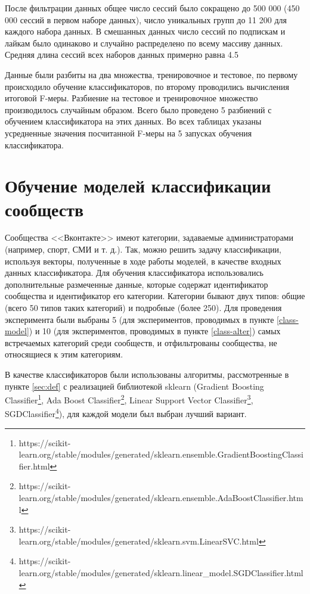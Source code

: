 \documentclass[times,specification,annotation]{itmo-student-thesis}
\begin{document}
После фильтрации данных общее число сессий было сокращено до 500 000 (450 000 сессий в первом наборе данных), число уникальных групп до 11 200 для каждого набора данных. В смешанных данных число сессий по подпискам и лайкам было одинаково и случайно распределено по всему массиву данных. Средняя длина сессий всех наборов данных примерно равна 4.5

Данные были разбиты на два множества, тренировочное и тестовое, по первому происходило обучение классификаторов, по второму проводились вычисления итоговой F-меры. Разбиение на тестовое и тренировочное множество производилось случайным образом. Всего было проведено 5 разбиений с обучением классификатора на этих данных. Во всех таблицах указаны усредненные значения посчитанной F-меры на 5 запусках обучения классификатора.

\section{Обучение моделей классификации сообществ}\label{sec:class}

Сообщества <<Вконтакте>> имеют категории, задаваемые администраторами
(например, спорт, СМИ и т. д.). Так, можно решить задачу классификации,
используя векторы, полученные в ходе работы моделей, в качестве входных
данных классификатора.  Для обучения классификатора использовались дополнительные размеченные данные, которые содержат идентификатор сообщества и идентификатор его категории. Категории бывают двух типов: общие (всего 50 типов таких категорий) и подробные (более 250). Для проведения эксперимента были выбраны 5 (для экспериментов, проводимых в пункте \ref{class-model}) и 10 (для экспериментов, проводимых в пункте \ref{class-alter}) самых встречаемых категорий среди сообществ, и отфильтрованы сообщества, не относящиеся к этим категориям.

В качестве классификаторов были использованы алгоритмы, рассмотренные в пункте \ref{sec:def} с реализацией библиотекой sklearn (Gradient Boosting Classifier\footnote{https://scikit-learn.org/stable/modules/generated/sklearn.ensemble.GradientBoostingClassifier.html}, Ada Boost Classifier\footnote{https://scikit-learn.org/stable/modules/generated/sklearn.ensemble.AdaBoostClassifier.html}, Linear Support Vector Classifier\footnote{https://scikit-learn.org/stable/modules/generated/sklearn.svm.LinearSVC.html}, SGDClassifier\footnote{https://scikit-learn.org/stable/modules/generated/sklearn.linear\_model.SGDClassifier.html}), для каждой модели был выбран лучший вариант. 
\end{document}
